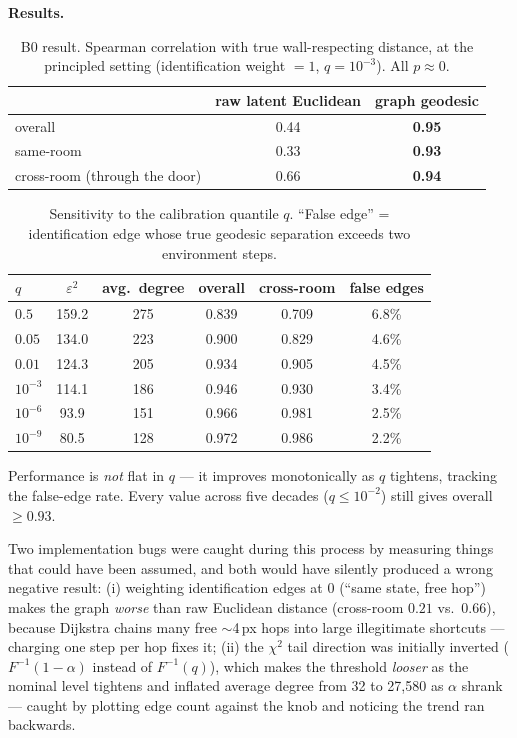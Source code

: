 \documentclass[11pt]{article}
\begin{document}
\textbf{Results.}

\begin{table}[h]
\centering
\caption{B0 result. Spearman correlation with true wall-respecting distance, at the principled
setting (identification weight $=1$, $q=10^{-3}$). All $p \approx 0$.}
\begin{tabular}{lcc}
\toprule
& raw latent Euclidean & graph geodesic \\
\midrule
overall & 0.44 & \textbf{0.95} \\
same-room & 0.33 & \textbf{0.93} \\
cross-room (through the door) & 0.66 & \textbf{0.94} \\
\bottomrule
\end{tabular}
\end{table}

\begin{table}[h]
\centering
\caption{Sensitivity to the calibration quantile $q$. ``False edge'' = identification edge whose
true geodesic separation exceeds two environment steps.}
\begin{tabular}{lccccc}
\toprule
$q$ & $\varepsilon^2$ & avg.\ degree & overall & cross-room & false edges \\
\midrule
$0.5$      & 159.2 & 275 & 0.839 & 0.709 & 6.8\% \\
$0.05$     & 134.0 & 223 & 0.900 & 0.829 & 4.6\% \\
$0.01$     & 124.3 & 205 & 0.934 & 0.905 & 4.5\% \\
$10^{-3}$  & 114.1 & 186 & 0.946 & 0.930 & 3.4\% \\
$10^{-6}$  &  93.9 & 151 & 0.966 & 0.981 & 2.5\% \\
$10^{-9}$  &  80.5 & 128 & 0.972 & 0.986 & 2.2\% \\
\bottomrule
\end{tabular}
\end{table}

Performance is \emph{not} flat in $q$ --- it improves monotonically as $q$ tightens, tracking the
false-edge rate. Every value across five decades ($q \le 10^{-2}$) still gives overall
$\ge 0.93$.

\label{sec:bugs}
Two implementation bugs were caught during this process by measuring things that could have been
assumed, and both would have silently produced a wrong negative result: (i) weighting
identification edges at $0$ (``same state, free hop'') makes the graph \emph{worse} than raw
Euclidean distance (cross-room $0.21$ vs.\ $0.66$), because Dijkstra chains many free
$\sim$4\,px hops into large illegitimate shortcuts --- charging one step per hop fixes it; (ii)
the $\chi^2$ tail direction was initially inverted ($F^{-1}(1-\alpha)$ instead of $F^{-1}(q)$),
which makes the threshold \emph{looser} as the nominal level tightens and inflated average degree
from 32 to 27{,}580 as $\alpha$ shrank --- caught by plotting edge count against the knob and
noticing the trend ran backwards.
\end{document}
